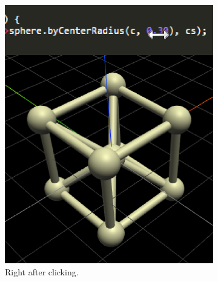 \begin{figure}
  \centering
  \begin{subfigure}[b]{0.3\linewidth}
    \includegraphics[width=1.0\linewidth]{./images/literal_adjustment/start_crop}
    \caption{Right after clicking.}
  \end{subfigure}
  \begin{subfigure}[b]{0.3\linewidth}

\end{subfigure}
\end{figure}
